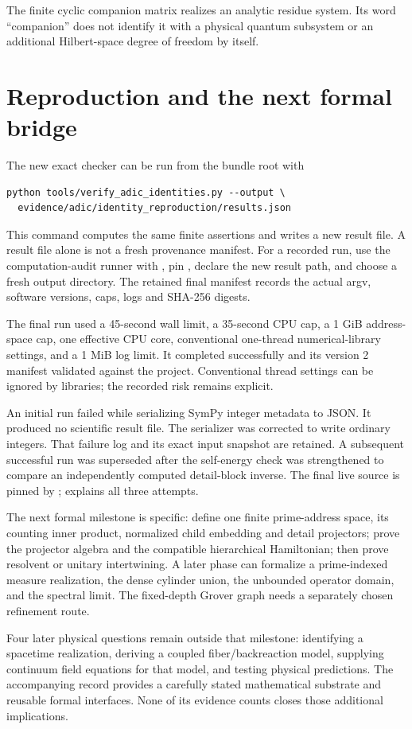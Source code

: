 The finite cyclic companion matrix realizes an analytic residue system. Its word ``companion'' does not identify it with a physical quantum subsystem or an additional Hilbert-space degree of freedom by itself.

\clearpage
\section{Reproduction and the next formal bridge}\label{a-verify-reproduction}

The new exact checker can be run from the bundle root with
\begin{lstlisting}
python tools/verify_adic_identities.py --output \
  evidence/adic/identity_reproduction/results.json
\end{lstlisting}
This command computes the same finite assertions and writes a new result file. A result file alone is not a fresh provenance manifest. For a recorded run, use the computation-audit runner with , pin , declare the new result path, and choose a fresh output directory. The retained final manifest records the actual argv, software versions, caps, logs and SHA-256 digests.

The final run used a 45-second wall limit, a 35-second CPU cap, a 1 GiB address-space cap, one effective CPU core, conventional one-thread numerical-library settings, and a 1 MiB log limit. It completed successfully and its version 2 manifest validated against the project. Conventional thread settings can be ignored by libraries; the recorded risk remains explicit.

An initial run failed while serializing SymPy integer metadata to JSON. It produced no scientific result file. The serializer was corrected to write ordinary integers. That failure log and its exact input snapshot are retained. A subsequent successful run was superseded after the self-energy check was strengthened to compare an independently computed detail-block inverse. The final live source is pinned by ;  explains all three attempts.

The next formal milestone is specific: define one finite prime-address space, its counting inner product, normalized child embedding and detail projectors; prove the projector algebra and the compatible hierarchical Hamiltonian; then prove resolvent or unitary intertwining. A later phase can formalize a prime-indexed measure realization, the dense cylinder union, the unbounded operator domain, and the spectral limit. The fixed-depth Grover graph needs a separately chosen refinement route.

Four later physical questions remain outside that milestone: identifying a spacetime realization, deriving a coupled fiber/backreaction model, supplying continuum field equations for that model, and testing physical predictions. The accompanying record provides a carefully stated mathematical substrate and reusable formal interfaces. None of its evidence counts closes those additional implications.
